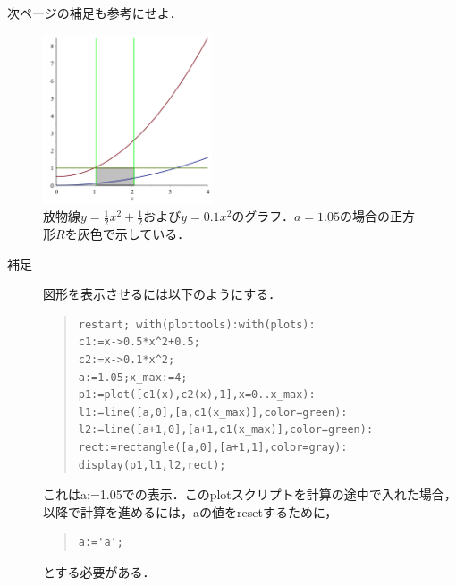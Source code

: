 \documentclass[12pt,a4j]{jarticle}
\begin{document}
\begin{enumerate}
次ページの補足も参考にせよ．

\pagebreak
\begin{figure}[htb]
  \begin{center}
    \includegraphics[width=5cm,bb=0 0 288 288]{./plot1.png}
    \caption{放物線$\displaystyle y=\frac{1}{2}x^2+\frac{1}{2}$および$\displaystyle y=0.1x^2$のグラフ．$a=1.05$の場合の正方形$R$を灰色で示している．}
  \end{center}
\end{figure}

\begin{description}
\item[補足]図形を表示させるには以下のようにする．
\begin{quote}
\begin{verbatim}
restart; with(plottools):with(plots):
c1:=x->0.5*x^2+0.5;
c2:=x->0.1*x^2;
a:=1.05;x_max:=4;
p1:=plot([c1(x),c2(x),1],x=0..x_max):
l1:=line([a,0],[a,c1(x_max)],color=green):
l2:=line([a+1,0],[a+1,c1(x_max)],color=green):
rect:=rectangle([a,0],[a+1,1],color=gray):
display(p1,l1,l2,rect);
\end{verbatim}
\end{quote}
これはa:=1.05での表示．このplotスクリプトを計算の途中で入れた場合，以降で計算を進めるには，aの値をresetするために，
\begin{quote}
\begin{verbatim}
a:='a';
\end{verbatim}
\end{quote}
とする必要がある．
\end{description}
\end{enumerate}
\end{document}
